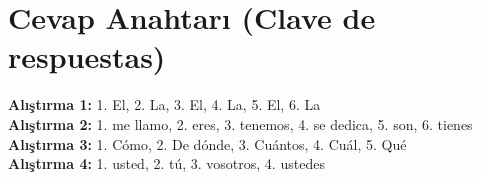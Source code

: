 \documentclass[12pt,a4paper]{article}
\begin{document}
\newpage
\section*{Cevap Anahtarı (Clave de respuestas)}
\textbf{Alıştırma 1:} 1. El, 2. La, 3. El, 4. La, 5. El, 6. La \\
\textbf{Alıştırma 2:} 1. me llamo, 2. eres, 3. tenemos, 4. se dedica, 5. son, 6. tienes \\
\textbf{Alıştırma 3:} 1. Cómo, 2. De dónde, 3. Cuántos, 4. Cuál, 5. Qué \\
\textbf{Alıştırma 4:} 1. usted, 2. tú, 3. vosotros, 4. ustedes
\end{document}
